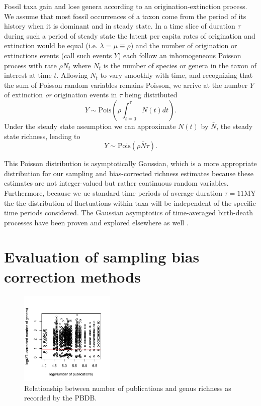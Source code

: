 \documentclass[12pt]{article}
\let\citep=\cite
\begin{document}
Fossil taxa gain and lose genera according to an origination-extinction
process. We assume that most fossil occurrences of a taxon come from
the period of its history when it is dominant and in steady state. In
a time slice of duration $\tau$ during such a period of steady state
the latent per capita rates of origination and extinction would be
equal (i.e. $\lambda = \mu \equiv \rho$) and the number of origination
or extinctions events (call such events $Y$) each follow an
inhomogeneous Poisson process with rate $\rho N_t$ where $N_t$ is the
number of species or genera in the taxon of interest at time
$t$. Allowing $N_t$ to vary smoothly with time, and recognizing that
the sum of Poisson random variables remains Poisson, we arrive at the
number $Y$ of extinction \emph{or} origination events in $\tau$ being
distributed
\begin{equation}
  \label{eq:eventPois1}
  Y \sim \text{Pois}(\rho \int_{t=0}^\tau N(t) dt).
\end{equation}
Under the steady state assumption we can approximate $N(t)$ by
$\bar{N}$, the steady state richness, leading to
\begin{equation}
  \label{eq:eventPois2}
  Y \sim \text{Pois}(\rho \bar{N} \tau).
\end{equation}

This Poisson distribution is asymptotically Gaussian, which is a more
appropriate distribution for our sampling and bias-corrected richness
estimates because these estimates are not integer-valued but rather
continuous random variables. Furthermore, because we ue standard time
periods of average duration $\tau = 11\text{MY}$ the the distribution
of fluctuations within taxa will be independent of the specific time
periods considered. The Gaussian asymptotics of time-averaged
birth-death processes have been proven and explored elsewhere as well
\citep{keilson1970, grassmann1987}.


\section{Evaluation of sampling bias correction methods}
\label{sec:suppBiasEval}

\citep{kocsis2018}

\begin{figure}[!hp]
  \centering
  \includegraphics[width=0.4\textwidth]{../../figSupp_divByPub.pdf}
  \caption[Relationship between number of publications and genus
  richness]{Relationship between number of publications and genus
    richness as recorded by the PBDB.}
  \label{fig:divByPub}
\end{figure}
\end{document}
